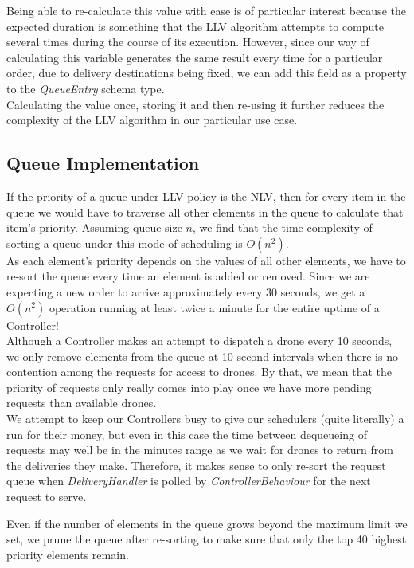 \documentclass[a4paper,11pt,titlepage]{report}
\begin{document}
Being able to re-calculate this value with ease is of particular interest because the expected duration is something that the LLV algorithm attempts to compute several times during the course of its execution. However, since our way of calculating this variable generates the same result every time for a particular order, due to delivery destinations being fixed, we can add this field as a property to the \textit{QueueEntry} schema type.\\

Calculating the value once, storing it and then re-using it further reduces the complexity of the LLV algorithm in our particular use case.

\subsection{Queue Implementation}
If the priority of a queue under LLV policy is the NLV, then for every item in the queue we would have to traverse all other elements in the queue to calculate that item's priority. Assuming queue size $n$, we find that the time complexity of sorting a queue under this mode of scheduling is $O(n^{2})$.\\

As each element's priority depends on the values of all other elements, we have to re-sort the queue every time an element is added or removed. Since we are expecting a new order to arrive approximately every 30 seconds, we get a $O(n^{2})$ operation running at least twice a minute for the entire uptime of a Controller!\\

Although a Controller makes an attempt to dispatch a drone every 10 seconds, we only remove elements from the queue at 10 second intervals when there is no contention among the requests for access to drones. By that, we mean that the priority of requests only really comes into play once we have more pending requests than available drones.\\

We attempt to keep our Controllers busy to give our schedulers (quite literally) a run for their money, but even in this case the time between dequeueing of requests may well be in the minutes range as we wait for drones to return from the deliveries they make. Therefore, it makes sense to only re-sort the request queue when \textit{DeliveryHandler} is polled by \textit{ControllerBehaviour} for the next request to serve.

\clearpage
Even if the number of elements in the queue grows beyond the maximum limit we set, we prune the queue after re-sorting to make sure that only the top 40 highest priority elements remain.
\end{document}
